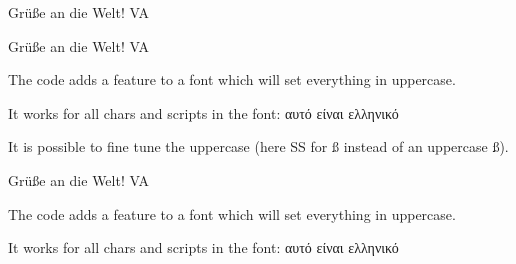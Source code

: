 \documentclass{article}
\begin{document}
Grüße an die Welt! VA

Grüße an die Welt! VA

The code adds a feature to a font which will set everything in uppercase.

It works for all chars and scripts in the font: αυτό είναι ελληνικό

It is possible to fine tune the uppercase (here SS for ß instead of an uppercase ß).

Grüße an die Welt! VA

The code adds a feature to a font which will set everything in uppercase.

It works for all chars and scripts in the font: αυτό είναι ελληνικό
\end{document}
